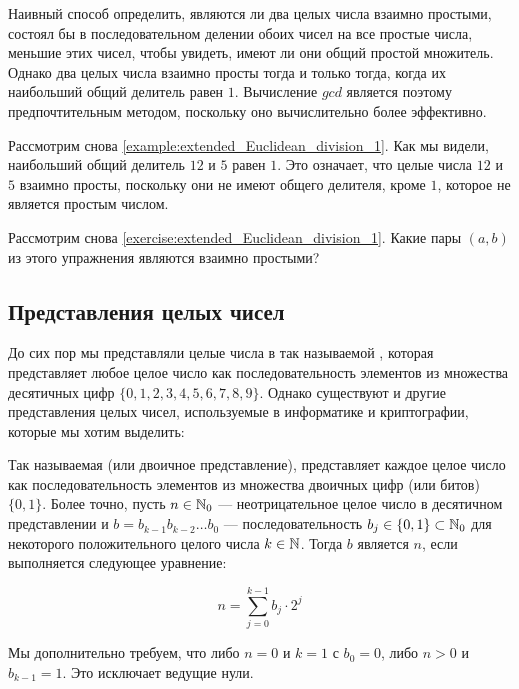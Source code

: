 Наивный способ определить, являются ли два целых числа взаимно простыми, состоял бы в последовательном делении обоих чисел на все простые числа, меньшие этих чисел, чтобы увидеть, имеют ли они общий простой множитель. Однако два целых числа взаимно просты тогда и только тогда, когда их наибольший общий делитель равен $1$. Вычисление $gcd$ является поэтому предпочтительным методом, поскольку оно вычислительно более эффективно.

\begin{example} Рассмотрим снова \examplename{} \ref{example:extended_Euclidean_division_1}. Как мы видели, наибольший общий делитель $12$ и $5$ равен $1$. Это означает, что целые числа $12$ и $5$ взаимно просты, поскольку они не имеют общего делителя, кроме $1$, которое не является простым числом.
\end{example}
\begin{exercise} Рассмотрим снова \exercisename{} \ref{exercise:extended_Euclidean_division_1}. Какие пары $(a,b)$ из этого упражнения являются взаимно простыми?
\end{exercise}
\subsection{Представления целых чисел}
\label{sec:integer-rep}
До сих пор мы представляли целые числа в так называемой , которая представляет любое целое число как последовательность элементов из множества десятичных цифр $\{0,1,2,3,4,5,6,7,8,9\}$. Однако существуют и другие представления целых чисел, используемые в информатике и криптографии, которые мы хотим выделить:

Так называемая  (или двоичное представление), представляет каждое целое число как последовательность элементов из множества двоичных цифр (или битов) $\{0,1\}$. Более точно, пусть $n\in\mathbb{N}_0$ — неотрицательное целое число в десятичном представлении и $b=b_{k-1}b_{k-2}\ldots b_{0}$ — последовательность  $b_j\in\{0,1\}\subset\mathbb{N}_0$ для некоторого положительного целого числа $k\in\mathbb{N}$. Тогда $b$ является  $n$, если выполняется следующее уравнение:

\begin{equation}
\label{def:binary_representation_integer}
n = \sum_{j=0}^{k-1} b_j\cdot 2^j
\end{equation}

Мы дополнительно требуем, что либо $n=0$ и $k=1$ с $b_0=0$, либо $n>0$ и $b_{k-1}=1$. Это исключает ведущие нули.

